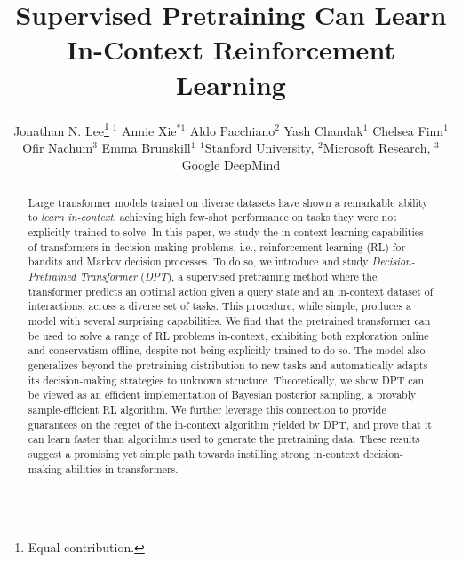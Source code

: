 \documentclass{article}
\title{
Supervised Pretraining Can Learn\\In-Context Reinforcement Learning
}
\author{
  Jonathan N. Lee\thanks{Equal contribution.}$^{\ \,1}$
  \And
  Annie Xie$^{*1}$
  \And
  Aldo Pacchiano$^{2}$
  \And
  Yash Chandak$^{1}$
  \AND
  Chelsea Finn$^{1}$
  \And
  Ofir Nachum$^{3}$
  \And
  Emma Brunskill$^{1}$
  \AND
  \textnormal{$^{1}$Stanford University, $^{2}$Microsoft Research,
  $^{3}$Google DeepMind}
}
\begin{document}
\maketitle
\begin{abstract}
Large transformer models trained on diverse datasets have shown a remarkable ability to \emph{learn in-context}, achieving high few-shot performance on tasks they were not explicitly trained to solve. In this paper, we study the in-context learning capabilities of transformers in decision-making problems, i.e., reinforcement learning (RL) for bandits and Markov decision processes. To do so, we introduce and study \emph{Decision-Pretrained Transformer} (\emph{DPT}), a supervised pretraining method where the transformer predicts an optimal action given a query state and an in-context dataset of interactions, across a diverse set of tasks. This procedure, while simple, produces a model with several surprising capabilities. We find that the pretrained transformer can be used to solve a range of RL problems in-context, exhibiting both exploration online and conservatism offline, despite not being explicitly trained to do so. The model also generalizes beyond the pretraining distribution to new tasks and automatically adapts its decision-making strategies to unknown structure. Theoretically, we show DPT can be viewed as an efficient implementation of Bayesian posterior sampling, a provably sample-efficient RL algorithm. We further leverage this connection to provide guarantees on the regret of the in-context algorithm yielded by DPT, and prove that it can learn faster than algorithms used to generate the pretraining data. These results suggest a promising yet simple path towards instilling strong in-context decision-making abilities in transformers.
\end{abstract}
\end{document}
